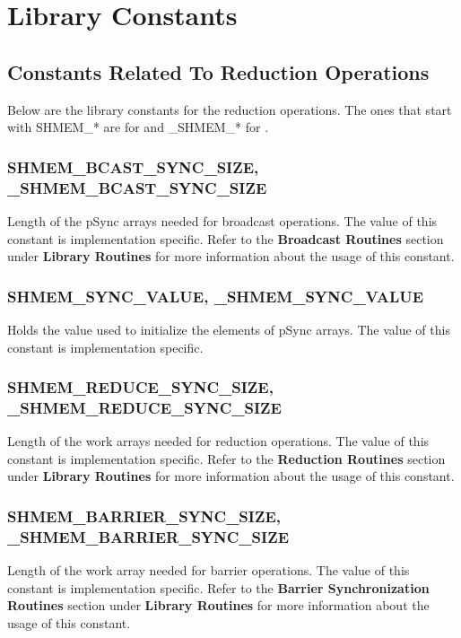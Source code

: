 
\section{Library Constants}


\subsection{Constants Related To Reduction Operations}
Below are the library constants for the reduction operations.
The ones that start with SHMEM\_* are for \Fortran{} and 
\_SHMEM\_* for \Clang.

\subsubsection{SHMEM\_BCAST\_SYNC\_SIZE, \_SHMEM\_BCAST\_SYNC\_SIZE}

Length of the pSync arrays needed for broadcast operations. The value
of this constant is implementation specific. Refer to the \textbf{Broadcast
Routines} section under \textbf{Library Routines} for more information
about the usage of this constant.


\subsubsection{SHMEM\_SYNC\_VALUE, \_SHMEM\_SYNC\_VALUE}

Holds the value used to initialize the elements of pSync arrays. The
value of this constant is implementation specific.


\subsubsection{SHMEM\_REDUCE\_SYNC\_SIZE, \_SHMEM\_REDUCE\_SYNC\_SIZE}

Length of the work arrays needed for reduction operations. The value
of this constant is implementation specific. Refer to the \textbf{Reduction
Routines} section under \textbf{Library Routines} for more information
about the usage of this constant.


\subsubsection{SHMEM\_BARRIER\_SYNC\_SIZE, \_SHMEM\_BARRIER\_SYNC\_SIZE }

Length of the work array needed for barrier operations. The value
of this constant is implementation specific. Refer to the \textbf{Barrier
Synchronization Routines} section under \textbf{Library Routines}
for more information about the usage of this constant.


